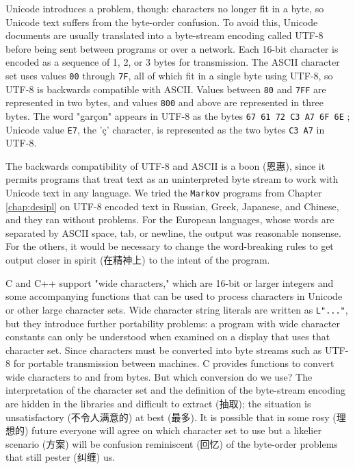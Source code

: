 Unicode introduces a problem, though: characters no longer fit in a byte,
so Unicode text suffers from the byte-order confusion. To avoid this,
Unicode documents are usually translated into a byte-stream encoding called
UTF-8 before being sent between programs or over a network. Each 16-bit
character is encoded as a sequence of 1, 2, or 3 bytes for transmission.
The ASCII character set uses values \verb'00' through \verb'7F', all of
which fit in a single byte using UTF-8, so UTF-8 is backwards compatible
with ASCII. Values between \verb'80' and \verb'7FF' are represented in two
bytes, and values \verb'800' and above are represented in three bytes. The
word "gar\c{c}on" appears in UTF-8 as the bytes \verb'67 61 72 C3 A7 6F 6E'
; Unicode value \verb'E7', the '\c{c}' character, is represented as the
two bytes \verb'C3 A7' in UTF-8.

The backwards compatibility of UTF-8 and ASCII is a boon (恩惠), since it
permits programs that treat text as an uninterpreted byte stream to work
with Unicode text in any language. We tried the \verb'Markov' programs from
Chapter \ref{chap:desipl} on UTF-8 encoded text in Russian, Greek,
Japanese, and Chinese, and they ran without problems. For the European
languages, whose words are separated by ASCII space, tab, or newline, the
output was reasonable nonsense. For the others, it would be necessary to
change the word-breaking rules to get output closer in spirit (在精神上) to
the intent of the program.

C and C++ support "wide characters," which are 16-bit or larger integers
and some accompanying functions that can be used to process characters in
Unicode or other large character sets. Wide character string literals are
written as \verb'L"..."', but they introduce further portability problems:
a program with wide character constants can only be understood when
examined on a display that uses that character set.  Since characters must
be converted into byte streams such as UTF-8 for portable transmission
between machines. C provides functions to convert wide characters to and
from bytes. But which conversion do we use? The interpretation of the
character set and the definition of the byte-stream encoding are hidden in
the libraries and difficult to extract (抽取); the situation is
unsatisfactory (不令人满意的) at best (最多). It is possible that in some
rosy (理想的) future everyone will agree on which character set to use but
a likelier scenario (方案) will be confusion reminiscent (回忆) of the
byte-order problems that still pester (纠缠) us.

